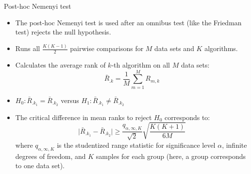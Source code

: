 \documentclass[11pt,compress,t,notes=noshow, aspectratio=169, xcolor=table]{beamer}
\begin{document}





\begin{frame}{Post-hoc Nemenyi test}

\begin{itemize}
\setlength\itemsep{1em}
\item The post-hoc Nemenyi test is used after an omnibus test (like the Friedman test) rejects the null hypothesis.
\item Runs all $\frac{K(K-1)}{2}$ pairwise comparisons for $M$ data sets and $K$ algorithms.
\item Calculates the average rank of $k$-th algorithm on all $M$ data sets: 
$$
\bar{R}_{.k} =\frac{1}{M} \sum_{m=1}^M R_{m, k}
$$
\item $H_0: \bar{R}_{.k_1} = \bar{R}_{.k_2}$ versus 
$H_1: \bar{R}_{.k_1} \neq \bar{R}_{.k_2}$
\item The critical difference in mean ranks to reject $H_0$ corresponds to:
$$ 
\vert \bar{R}_{.k_1} - \bar{R}_{.k_2} \vert \geq \frac{q_{\alpha, \infty, K}}{\sqrt{2}} \sqrt{\frac{K(K + 1)}{6M}}
$$
where $q_{\alpha, \infty, K}$ is the studentized range statistic for significance level $\alpha$, infinite degrees of freedom, and $K$ samples for each group (here, a group corresponds to one data set).
\end{itemize}
\end{frame}
\end{document}
